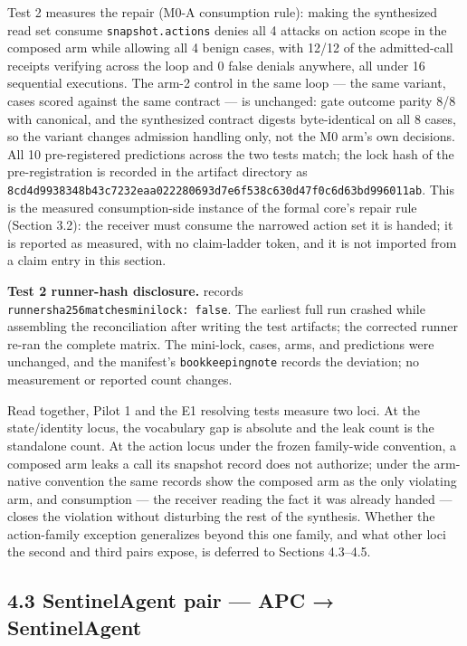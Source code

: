 \documentclass[
  10pt,
]{article}
\renewcommand{\_}{\origunderscore\allowbreak}
\begin{document}
Test 2 measures the repair (M0-A consumption rule): making the
synthesized read set consume \texttt{snapshot.actions} denies all 4
attacks on action scope in the composed arm while allowing all 4 benign
cases, with 12/12 of the admitted-call receipts verifying across the
loop and 0 false denials anywhere, all under 16 sequential executions.
The arm-2 control in the same loop --- the same variant, cases scored
against the same contract --- is unchanged: gate outcome parity 8/8 with
canonical, and the synthesized contract digests byte-identical on all 8
cases, so the variant changes admission handling only, not the M0 arm's
own decisions. All 10 pre-registered predictions across the two tests
match; the lock hash of the pre-registration is recorded in the artifact
directory as
\texttt{8cd4d9938348b43c7232eaa022280693d7e6f538c630d47f0c6d63bd996011ab}.
This is the measured consumption-side instance of the formal core's
repair rule (Section 3.2): the receiver must consume the narrowed action
set it is handed; it is reported as measured, with no claim-ladder
token, and it is not imported from a claim entry in this section.

\textbf{Test 2 runner-hash disclosure.}
records \texttt{runner\_sha256\_matches\_mini\_lock:\ false}. The
earliest full run crashed while assembling the reconciliation after
writing the test artifacts; the corrected runner re-ran the complete
matrix. The mini-lock, cases, arms, and predictions were unchanged, and
the manifest's \texttt{bookkeeping\_note} records the deviation; no
measurement or reported count changes.

Read together, Pilot 1 and the E1 resolving tests measure two loci. At
the state/identity locus, the vocabulary gap is absolute and the leak
count is the standalone count. At the action locus under the frozen
family-wide convention, a composed arm leaks a call its snapshot record
does not authorize; under the arm-native convention the same records
show the composed arm as the only violating arm, and consumption --- the
receiver reading the fact it was already handed --- closes the violation
without disturbing the rest of the synthesis. Whether the action-family
exception generalizes beyond this one family, and what other loci the
second and third pairs expose, is deferred to Sections 4.3--4.5.

\subsection{4.3 SentinelAgent pair --- APC →
SentinelAgent}\label{sentinelagent-pair-apc-sentinelagent}
\end{document}
